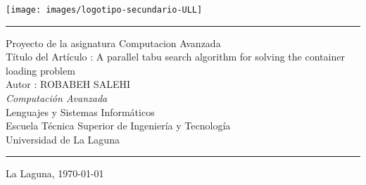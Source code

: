\documentclass[spanish,a4paper,11pt,twoside]{report}
\begin{document}

\pagestyle{empty}
\thispagestyle{empty}


\newcommand{\HRule}{\rule{\linewidth}{1mm}}
\setlength{\parindent}{0mm}
\setlength{\parskip}{0mm}

\begin{center}
\texttt{[image: images/logotipo-secundario-ULL]}\\[0.25cm]
\end{center}

\HRule
\begin{center}
        {\Huge Proyecto de la asignatura Computacion Avanzada } \\[2.5mm] 
        {\Huge Título del Artículo :  A parallel tabu search algorithm for solving
the container loading problem
} \\[5mm]

        {\Large Autor : ROBABEH SALEHI} \\[10mm]

        {\em Computación Avanzada} \\[5mm]
        Lenguajes y Sistemas Informáticos \\[5mm]
        Escuela Técnica Superior de Ingeniería y Tecnología \\[5mm]
        
        Universidad de La Laguna \\
\end{center}
\HRule
{}
\begin{center}
  La Laguna, \today 
\end{center}
\end{document}
